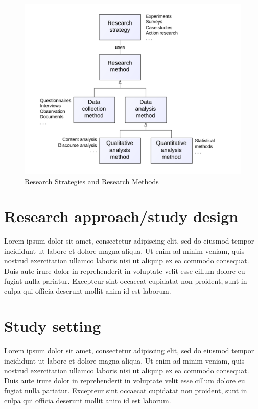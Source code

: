 \documentclass[11pt]{report}
\begin{document}
\begin{figure} [h]
\centering
\includegraphics[scale = 0.2]{img/methods.png}
\caption{Research Strategies and Research Methods}
 \label{fig:methods}
\end{figure}

\section{Research approach/study design}

Lorem ipsum dolor sit amet, consectetur adipiscing elit, sed do eiusmod tempor incididunt ut labore et dolore magna aliqua. Ut enim ad minim veniam, quis nostrud exercitation ullamco laboris nisi ut aliquip ex ea commodo consequat. Duis aute irure dolor in reprehenderit in voluptate velit esse cillum dolore eu fugiat nulla pariatur. Excepteur sint occaecat cupidatat non proident, sunt in culpa qui officia deserunt mollit anim id est laborum.

\section{Study setting}

Lorem ipsum dolor sit amet, consectetur adipiscing elit, sed do eiusmod tempor incididunt ut labore et dolore magna aliqua. Ut enim ad minim veniam, quis nostrud exercitation ullamco laboris nisi ut aliquip ex ea commodo consequat. Duis aute irure dolor in reprehenderit in voluptate velit esse cillum dolore eu fugiat nulla pariatur. Excepteur sint occaecat cupidatat non proident, sunt in culpa qui officia deserunt mollit anim id est laborum.
\end{document}
